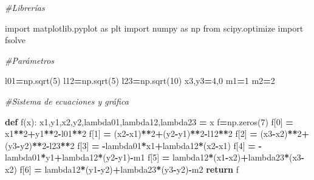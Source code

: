 \documentclass[
]{book}
\newenvironment{Shaded}{\begin{snugshade}}{\end{snugshade}}
\newcommand{\CommentTok}[1]{\textcolor[rgb]{0.56,0.35,0.01}{\textit{#1}}}
\newcommand{\ControlFlowTok}[1]{\textcolor[rgb]{0.13,0.29,0.53}{\textbf{#1}}}
\newcommand{\DecValTok}[1]{\textcolor[rgb]{0.00,0.00,0.81}{#1}}
\newcommand{\ImportTok}[1]{#1}
\newcommand{\KeywordTok}[1]{\textcolor[rgb]{0.13,0.29,0.53}{\textbf{#1}}}
\newcommand{\NormalTok}[1]{#1}
\newcommand{\OperatorTok}[1]{\textcolor[rgb]{0.81,0.36,0.00}{\textbf{#1}}}
\theoremstyle{definition}
\theoremstyle{definition}
\theoremstyle{definition}
\theoremstyle{definition}
\theoremstyle{remark}
\begin{document}
\begin{Shaded}
\begin{Highlighting}[]
\CommentTok{\#Librerías}

\ImportTok{import}\NormalTok{ matplotlib.pyplot }\ImportTok{as}\NormalTok{ plt}
\ImportTok{import}\NormalTok{ numpy }\ImportTok{as}\NormalTok{ np}
\ImportTok{from}\NormalTok{ scipy.optimize }\ImportTok{import}\NormalTok{ fsolve}

\CommentTok{\#Parámetros}

\NormalTok{l01}\OperatorTok{=}\NormalTok{np.sqrt(}\DecValTok{5}\NormalTok{)}
\NormalTok{l12}\OperatorTok{=}\NormalTok{np.sqrt(}\DecValTok{5}\NormalTok{)}
\NormalTok{l23}\OperatorTok{=}\NormalTok{np.sqrt(}\DecValTok{10}\NormalTok{)}
\NormalTok{x3,y3}\OperatorTok{=}\DecValTok{4}\NormalTok{,}\DecValTok{0}
\NormalTok{m1}\OperatorTok{=}\DecValTok{1}
\NormalTok{m2}\OperatorTok{=}\DecValTok{2}

\CommentTok{\#Sistema de ecuaciones y gráfica}

\KeywordTok{def}\NormalTok{ f(x):}
\NormalTok{  x1,y1,x2,y2,lambda01,lambda12,lambda23 }\OperatorTok{=}\NormalTok{ x}
\NormalTok{  f}\OperatorTok{=}\NormalTok{np.zeros(}\DecValTok{7}\NormalTok{)}
\NormalTok{  f[}\DecValTok{0}\NormalTok{] }\OperatorTok{=}\NormalTok{ x1}\OperatorTok{**}\DecValTok{2}\OperatorTok{+}\NormalTok{y1}\OperatorTok{**}\DecValTok{2}\OperatorTok{{-}}\NormalTok{l01}\OperatorTok{**}\DecValTok{2}
\NormalTok{  f[}\DecValTok{1}\NormalTok{] }\OperatorTok{=}\NormalTok{ (x2}\OperatorTok{{-}}\NormalTok{x1)}\OperatorTok{**}\DecValTok{2}\OperatorTok{+}\NormalTok{(y2}\OperatorTok{{-}}\NormalTok{y1)}\OperatorTok{**}\DecValTok{2}\OperatorTok{{-}}\NormalTok{l12}\OperatorTok{**}\DecValTok{2}
\NormalTok{  f[}\DecValTok{2}\NormalTok{] }\OperatorTok{=}\NormalTok{ (x3}\OperatorTok{{-}}\NormalTok{x2)}\OperatorTok{**}\DecValTok{2}\OperatorTok{+}\NormalTok{(y3}\OperatorTok{{-}}\NormalTok{y2)}\OperatorTok{**}\DecValTok{2}\OperatorTok{{-}}\NormalTok{l23}\OperatorTok{**}\DecValTok{2}
\NormalTok{  f[}\DecValTok{3}\NormalTok{] }\OperatorTok{=} \OperatorTok{{-}}\NormalTok{lambda01}\OperatorTok{*}\NormalTok{x1}\OperatorTok{+}\NormalTok{lambda12}\OperatorTok{*}\NormalTok{(x2}\OperatorTok{{-}}\NormalTok{x1)}
\NormalTok{  f[}\DecValTok{4}\NormalTok{] }\OperatorTok{=} \OperatorTok{{-}}\NormalTok{lambda01}\OperatorTok{*}\NormalTok{y1}\OperatorTok{+}\NormalTok{lambda12}\OperatorTok{*}\NormalTok{(y2}\OperatorTok{{-}}\NormalTok{y1)}\OperatorTok{{-}}\NormalTok{m1}
\NormalTok{  f[}\DecValTok{5}\NormalTok{] }\OperatorTok{=}\NormalTok{ lambda12}\OperatorTok{*}\NormalTok{(x1}\OperatorTok{{-}}\NormalTok{x2)}\OperatorTok{+}\NormalTok{lambda23}\OperatorTok{*}\NormalTok{(x3}\OperatorTok{{-}}\NormalTok{x2)}
\NormalTok{  f[}\DecValTok{6}\NormalTok{] }\OperatorTok{=}\NormalTok{ lambda12}\OperatorTok{*}\NormalTok{(y1}\OperatorTok{{-}}\NormalTok{y2)}\OperatorTok{+}\NormalTok{lambda23}\OperatorTok{*}\NormalTok{(y3}\OperatorTok{{-}}\NormalTok{y2)}\OperatorTok{{-}}\NormalTok{m2}
  \ControlFlowTok{return}\NormalTok{ f}


\end{Highlighting}
\end{Shaded}
\end{document}
